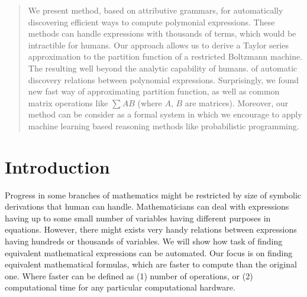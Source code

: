 \documentclass{article}
\begin{document}
 





\vskip 0.3in


\begin{abstract} 
  We present method, based on attributive grammars, for automatically
  discovering efficient ways to compute polymonial expressions. These
  methods can handle expressions with thousands of terms, which would
  be intractible for humans. Our approach allows us to derive a Taylor
  series approximation to the partition function of a restricted
  Boltzmann machine. The resulting well beyond
  the analytic capability of humans.   of automatic
  discovery relations between polynomial expressions.  Surprisingly,
  we found new fast way of approximating partition function, as well
  as common matrix operations like $\sum AB$ (where $A$, $B$ are
  matrices). Moreover, our method can be consider as a formal system
  in which we encourage to apply machine learning based reasoning
  methods like probabilistic programming.

\end{abstract} 


\section{Introduction} \label{introduction} 
Progress in some branches of
mathematics might be restricted by size of symbolic derivations that human can
handle.  Mathematicians can deal with expressions having up to some small
number of variables having different purposes in equations. However, there
might exists very handy relations between expressions having hundreds or
thousands of variables. We will show how task of finding equivalent
mathematical expressions can be automated. Our focus is on finding equivalent
mathematical formulas, which are faster to compute than the original one. Where
faster can be defined as (1) number of operations, or (2) computational time
for any particular computational hardware.
\end{document}
